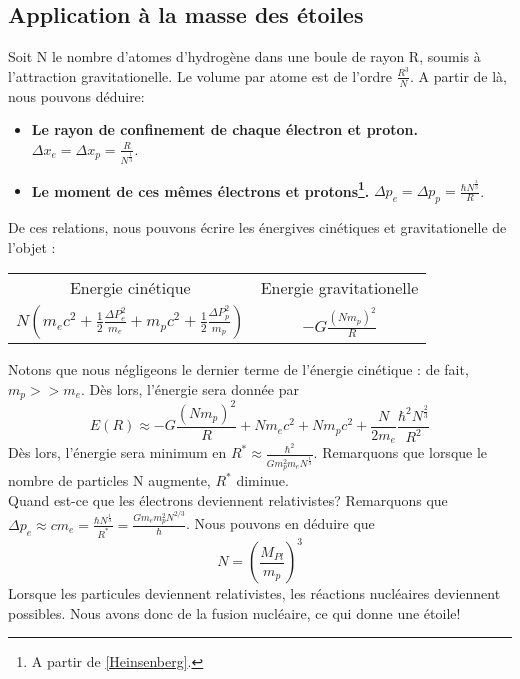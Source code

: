 \documentclass[../Notes de cours]{subfiles}
\begin{document}
\subsection{Application à la masse des étoiles}
Soit N le nombre d'atomes d'hydrogène dans une boule de rayon R, soumis à l'attraction gravitationelle. Le volume par atome est de l'ordre $\frac{R^3}{N}$. A partir de là, nous pouvons déduire:
\begin{itemize}
\item \textbf{Le rayon de confinement de chaque électron et proton.} $\Delta x_e = \Delta x_p = \frac{R}{N^{\frac{1}{3}}}$.
\item \textbf{Le moment de ces mêmes électrons et protons\footnote{A partir de \ref{Heinsenberg}.}.} $\Delta p_e = \Delta p_p = \frac{\hbar N^{\frac{1}{3}}}{R} $.\\
\end{itemize}

De ces relations, nous pouvons écrire les énergives cinétiques et gravitationelle de l'objet : 
\begin{center}
\begin{tabular}{c c}
Energie cinétique & Energie gravitationelle\\
$N \left( m_e c^2 + \frac{1}{2} \frac{\Delta P_e^2}{m_e} + m_p c^2 + \frac{1}{2} \frac{\Delta P_p^2}{m_p} \right)$ & $- G \frac{(Nm_p)^2}{R}$
\end{tabular}
\end{center}
Notons que nous négligeons le dernier terme de l'énergie cinétique : de fait, $m_p >> m_e$.
Dès lors, l'énergie sera donnée par 
\begin{equation}
E(R) \approx - G \frac{(Nm_p)^2}{R} + Nm_e c^2 + Nm_p c^2 + \frac{N}{2m_e} \frac{\hbar^2 N^{\frac{2}{3}}}{R^2}
\end{equation}
Dès lors, l'énergie sera minimum en $R^* \approx \frac{\hbar^2}{Gm_p^2m_eN^{\frac{1}{3}}}$. Remarquons que lorsque le nombre de particles N augmente, $R^*$ diminue.\\

Quand est-ce que les électrons deviennent relativistes? Remarquons que $\Delta p_e \approx cm_e = \frac{\hbar N^{\frac{1}{3}}}{R^*} = \frac{Gm_em_p^2N^{2/3}}{\hbar}$. Nous pouvons en déduire que 
\begin{equation}
N = \left( \frac{M_{Pl}}{m_p} \right)^3
\end{equation}
Lorsque les particules deviennent relativistes, les réactions nucléaires deviennent possibles. Nous avons donc de la fusion nucléaire, ce qui donne une étoile!\\
\end{document}
